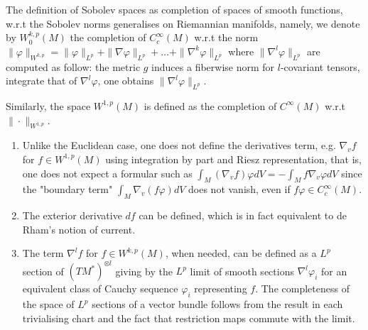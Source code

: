 The definition of Sobolev spaces as completion of spaces of smooth functions, w.r.t the
Sobolev norms generalises on Riemannian manifolds, namely, we denote by \(W_0^{k,p}(M)\)
the completion of \(C_c^\infty(M)\) w.r.t the norm
\(\|\varphi\|_{W^{k,p}} = \|\varphi\|_{L^p} + \|\nabla \varphi \|_{L^p} + \dots + \|\nabla^k \varphi \|_{L^p}\)
where \(\|\nabla^l\varphi\|_{L^p}\) are computed as follow: the metric \(g\) induces a
fiberwise norm for \(l\)-covariant tensors, integrate that of \(\nabla^l \varphi\), one
obtains \(\|\nabla^l\varphi\|_{L^p}\).

Similarly, the space \(W^{1,p}(M)\) is defined as the completion of \(C^\infty(M)\) w.r.t \(\|\cdot\|_{W^{1,p}}\). 

\begin{remark}
\label{rem:sobolev-def}
\begin{enumerate}
\item Unlike the Euclidean case, one does not define the derivatives term, e.g. \(\nabla_v f\) for \(f\in W^{1,p}(M)\) using integration by part and Riesz representation,
that is, one does not expect a formular such as \(\int_M (\nabla_v f)\varphi dV = -\int_M
   f\nabla_v \varphi dV\) since the "boundary term" \(\int_{M}\nabla_v(f\varphi) dV\) does not vanish, even if \(f\varphi \in C_c^\infty(M)\).
\item The exterior derivative \(df\) can be defined, which is in fact equivalent to de
Rham's notion of current.
\item The term \(\nabla^l f\) for \(f\in W^{k,p}(M)\), when needed, can be defined as a \(L^p\) section of \((TM^*)^{\otimes l}\) giving by the \(L^p\) limit of smooth
sections \(\nabla^l\varphi_i\) for an equivalent class of Cauchy sequence \(\varphi_i\) representing \(f\). The completeness of the space of \(L^p\) sections
of a vector bundle follows from the result in each trivialising chart and the fact that restriction maps
commute with the limit.
\end{enumerate}
\end{remark}


